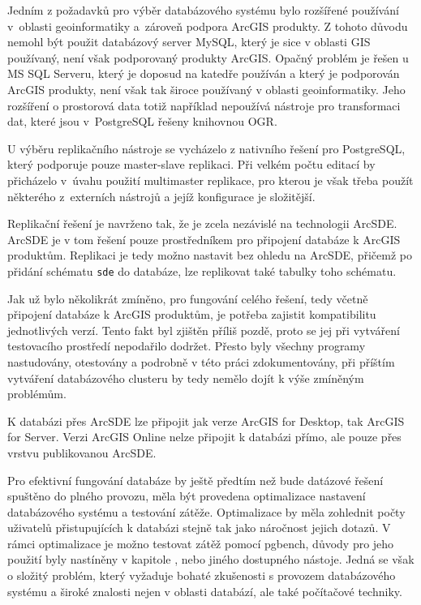 \label{kDiskuze}
Jedním z požadavků pro výběr databázového systému bylo rozšířené používání v~oblasti
geoinformatiky a~zároveň podpora ArcGIS produkty. Z tohoto důvodu nemohl být použit
databázový server MySQL, který je sice v oblasti GIS používaný, není však
podporovaný produkty Arc\-GIS. Opačný problém je řešen u MS SQL Serveru, který je
doposud na katedře používán a který je podporován ArcGIS produkty, není však
tak široce používaný v oblasti geoinformatiky. Jeho rozšíření o prostorová data
totiž například nepoužívá nástroje pro transformaci dat, které jsou v~PostgreSQL řešeny knihovnou OGR. 

U výběru replikačního nástroje se vycházelo z nativního řešení pro PostgreSQL, který
podporuje pouze master-slave replikaci. Při velkém počtu editací by přicházelo v~úvahu použití multimaster replikace, pro kterou je však třeba použít
některého z~externích nástrojů a jejíž konfigurace je složitější. 

Replikační řešení je navrženo tak, že je zcela nezávislé na technologii ArcSDE.
ArcSDE je v tom řešení pouze prostředníkem pro připojení databáze k ArcGIS
produktům. Replikaci je tedy možno nastavit bez ohledu na ArcSDE, přičemž po přidání schématu
\texttt{sde} do databáze, lze replikovat také tabulky toho schématu. 

Jak už bylo několikrát zmíněno, pro fungování celého řešení, tedy včetně
připojení databáze k ArcGIS produktům, je potřeba zajistit kompatibilitu jednotlivých verzí.
Tento fakt byl zjištěn příliš pozdě, proto se jej při vytváření testovacího prostředí nepodařilo dodržet.
Přesto byly všechny programy nastudovány, otestovány a podrobně v této práci zdokumentovány,
při příštím vytváření databázového clusteru by tedy nemělo dojít k výše zmíněným problémům.

K databázi přes ArcSDE lze připojit jak verze ArcGIS for
Desktop, tak ArcGIS for Server. Verzi ArcGIS Online nelze připojit k databázi
přímo, ale pouze přes vrstvu publikovanou ArcSDE. 

Pro efektivní fungování databáze by ještě předtím než bude
datázové řešení spuštěno do plného provozu, měla být provedena optimalizace nastavení
databázového systému a testování zátěže. Optimalizace by měla zohlednit počty uživatelů
přistupujících k databázi stejně tak jako náročnost jejich dotazů. V rámci
optimalizace je možno testovat zátěž pomocí pgbench, důvody pro jeho použití
byly nastíněny v kapitole , nebo jiného dostupného
nástoje. Jedná se však o složitý problém, který vyžaduje bohaté zkušenosti s
provozem databázového systému a široké znalosti nejen v oblasti databází, ale
také počítačové techniky.  

